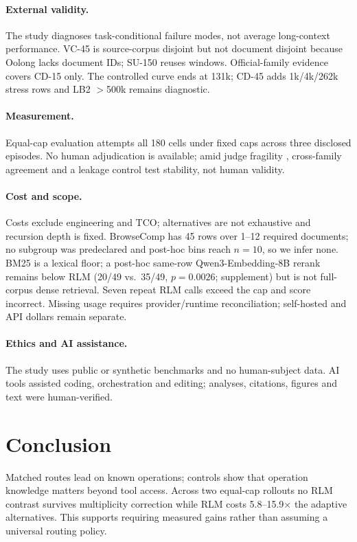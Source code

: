 \documentclass[letterpaper]{article}
\begin{document}
\paragraph{External validity.}
The study diagnoses task-conditional failure modes, not average long-context performance. VC-45 is source-corpus disjoint but not document disjoint because Oolong lacks document IDs; SU-150 reuses windows. Official-family evidence covers CD-15 only. The controlled curve ends at 131k; CD-45 adds 1k/4k/262k stress rows and LB2 $>$500k remains diagnostic.

\paragraph{Measurement.}
Equal-cap evaluation attempts all 180 cells under fixed caps across three disclosed episodes. No human adjudication is available; amid judge fragility \citep{tan2025judgebench}, cross-family agreement and a leakage control test stability, not human validity.

\paragraph{Cost and scope.}
Costs exclude engineering and TCO; alternatives are not exhaustive and recursion depth is fixed. BrowseComp has 45 rows over 1--12 required documents; no subgroup was predeclared and post-hoc bins reach $n{=}10$, so we infer none. BM25 is a lexical floor; a post-hoc same-row Qwen3-Embedding-8B rerank remains below RLM (20/49 vs.\ 35/49, $p{=}0.0026$; supplement) but is not full-corpus dense retrieval. Seven repeat RLM calls exceed the cap and score incorrect. Missing usage requires provider/runtime reconciliation; self-hosted and API dollars remain separate.

\paragraph{Ethics and AI assistance.}
The study uses public or synthetic benchmarks and no human-subject data. AI tools assisted coding, orchestration and editing; analyses, citations, figures and text were human-verified.

\section{Conclusion}

Matched routes lead on known operations; controls show that operation knowledge matters beyond tool access. Across two equal-cap rollouts no RLM contrast survives multiplicity correction while RLM costs 5.8--15.9$\times$ the adaptive alternatives. This supports requiring measured gains rather than assuming a universal routing policy.


\end{document}
